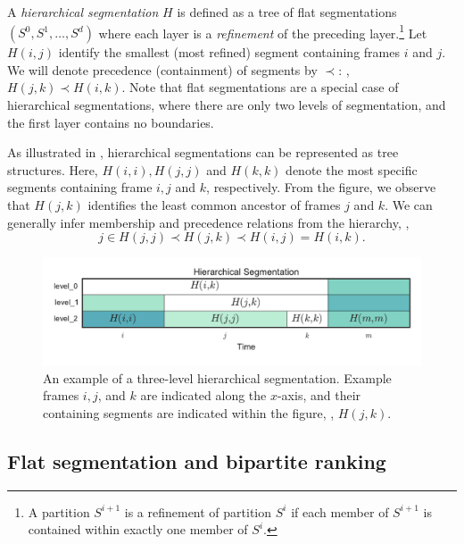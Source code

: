 \documentclass{article}
\begin{document}
A \emph{hierarchical segmentation} $H$ is defined as a tree of flat segmentations $(S^0, S^1, \dots, S^d)$ where each layer is a \emph{refinement}
of the preceding layer.\footnote{A partition $S^{i+1}$ is a refinement of partition $S^{i}$ if each member of $S^{i+1}$ is contained within exactly one member of $S^i$.}
Let $H(i,j)$ identify the smallest (most refined) segment containing frames $i$ and $j$.
We will denote precedence (containment) of segments by $\prec$: \eg, $H(j, k) \prec H(i, k)$.
Note that flat segmentations are a special case of hierarchical segmentations, where there are only two
levels of segmentation, and the first layer contains no boundaries.

As illustrated in , hierarchical segmentations can be represented as tree structures.
Here, $H(i, i), H(j, j)$ and $H(k,k)$ denote the most specific segments containing frame $i, j$ and $k$,
respectively.
From the figure, we observe that $H(j,k)$ identifies the least common ancestor of frames $j$ and $k$.
We can generally infer membership and precedence relations from the hierarchy, \eg,
\begin{equation}
j \in H(j, j) \prec H(j, k) \prec H(i, j) = H(i, k).
\end{equation}


\begin{figure}
  \centering
  \includegraphics[width=\columnwidth]{figs/hier-example.pdf}
  \caption{An example of a three-level hierarchical segmentation.
  Example frames $i, j$, and $k$ are indicated along the $x$-axis, and their containing segments are indicated
  within the figure, \eg, $H(j, k)$.}\label{fig:hier-example}
\end{figure}


\subsection{Flat segmentation and bipartite ranking}
\end{document}
